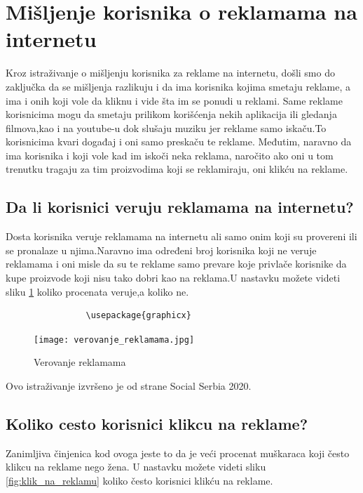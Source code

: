 \documentclass[a4paper]{article}
\begin{document}
{{			
			\section{Mišljenje korisnika o reklamama na internetu}
			\label{sec:misljenje}
			Kroz istraživanje o mišljenju korisnika za reklame na internetu, došli smo do zaključka da se mišljenja razlikuju i da ima korisnika kojima smetaju reklame, a ima i onih koji vole da kliknu i vide šta im se ponudi u reklami.
			Same reklame korisnicima mogu da smetaju prilikom korišćenja nekih aplikacija ili gledanja filmova,kao i na youtube-u dok slušaju muziku jer reklame samo iskaču.To korisnicima kvari događaj i oni samo preskaču te reklame.
			Međutim, naravno da ima korisnika i koji vole kad im iskoči neka reklama, naročito ako oni u tom trenutku tragaju za tim proizvodima koji se reklamiraju, oni klikću na reklame.
			\subsection{Da li korisnici veruju reklamama na internetu?}
			\label{subsec:veovanje_reklamama}
			Dosta korisnika veruje reklamama na internetu ali samo onim koji su provereni ili se pronalaze u njima.Naravno ima određeni broj korisnika koji ne veruje reklamama i oni misle da su te reklame samo prevare koje privlače korisnike da kupe proizvode koji nisu tako dobri kao na reklama.U nastavku možete videti sliku \ref{fig:verovanje_reklamama} koliko procenata veruje,a koliko ne.
			\begin{verbatim}
				\usepackage{graphicx}
			\end{verbatim}
			
			\begin{figure}[h!]
				\begin{center}
					\texttt{[image: verovanje\_reklamama.jpg]}
				\end{center}
				\caption{Verovanje reklamama}
				\label{fig:verovanje_reklamama}
			\end{figure}
			Ovo istraživanje izvršeno je od strane Social Serbia 2020.
			\subsection{Koliko cesto korisnici klikcu na reklame?}
			\label{subsec:klik_na_reklamu}
			Zanimljiva činjenica kod ovoga jeste to da je veći procenat muškaraca koji često klikcu na reklame nego žena. U nastavku možete videti sliku \ref{fig:klik_na_reklamu} koliko često korisnici klikću na reklame.
			
}}
\end{document}
